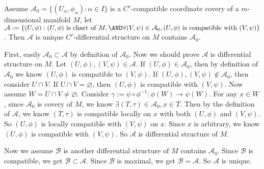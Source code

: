 \documentclass{ctexart}
\newif\ifpreface
\begin{document}
\large
\setlength{\baselineskip}{1.2em}
\ifpreface

\else
\maketitle
\fi
{}
\everymath{\displaystyle}
\newlength\inlineHeight
\newlength\inlineWidth
\long{}
\begin{problem}\label{pro:1.1}
  Assume \(\mathcal{A}_0=\{(U_\alpha,\phi_\alpha):\alpha \in I\}\) is a \(C^r\)-compatible coordinate covery of a \(m\)-dimensional manifold \(M\), let
  \(\mathcal{A}:= \{(U,\phi): (U,\phi) \text{ is chart of } M, \AND \forall (V,\psi)\in \mathcal{A}_0,(U,\phi)\text{ is compatible with }(V,\psi)\}\).
  Then \(\mathcal{A}\) is unique \(C^r\)-differential structure on \(M\) contains \(\mathcal{A}_0\).
\end{problem}
\begin{solution}

  First, easily \(\mathcal{A}_0 \subset \mathcal{A}\) by definition of \(\mathcal{A}_0\).
  Now we should prove \(\mathcal{A}\) is differential structure on \(M\). Let \((U,\phi),(V,\psi) \in \mathcal{A}\).
  If \((U,\phi)\in \mathcal{A}_0\), then by definition of \(\mathcal{A}_0\) we know \((U,\phi)\) is compatible to \((V,\psi)\).
  If \((U,\phi),(V,\psi) \notin \mathcal{A}_0\), then consider \(U\cap V\). If \(U\cap V=\varnothing\), then \((U,\phi)\) is compatible with \((V,\psi)\).
  Now assume \(W=U \cap V\neq \varnothing\). Consider \(\gamma:=\psi \circ \phi^{-1} :\phi(W) \to \psi(W)\).
  For any \(x \in W\), since \(\mathcal{A}_0\) is covery of \(M\), we know \(\exists (T,\tau) \in \mathcal{A}_0,x \in T\).
  Then by the definition of \(\mathcal{A}\), we know \((T,\tau)\) is compatible locally on \(x\) with both \((U,\phi)\) and \((V,\psi)\).
  So \((U,\phi)\) is locally compatible with \((V,\psi)\) on \(x\). Since \(x\) is arbitrary, we know \((U,\phi)\) is compatible with \((V,\psi)\).
  So \(\mathcal{A}\) is differential structure of \(M\).

  Now we assume \(\mathcal{B}\) is another differential structure of \(M\) contains \(\mathcal{A}_0\).
  Since \(\mathcal{B}\) is compatible, we get \(\mathcal{B} \subset \mathcal{A}\).
  Since \(\mathcal{B}\) is maximal, we get \(\mathcal{B}=\mathcal{A}\).
  So \(\mathcal{A}\) is unique.
\end{solution}
\end{document}
